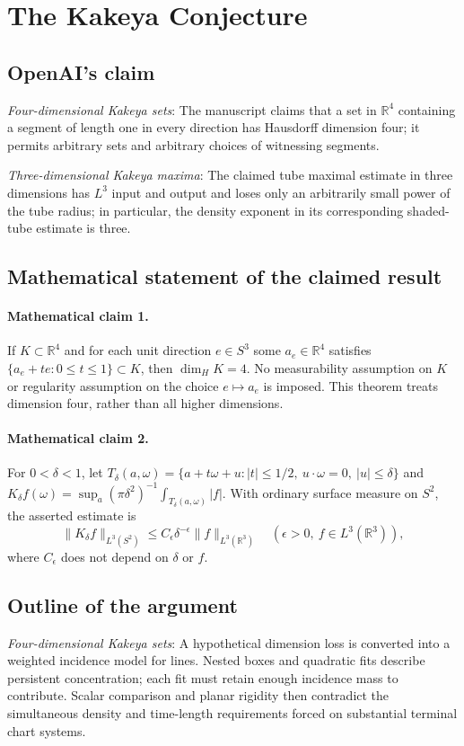 \documentclass[11pt]{article}
\begin{document}
\section*{The Kakeya Conjecture}

\subsection{OpenAI's claim}
\textit{Four-dimensional Kakeya sets}: The manuscript claims that a set in $\mathbb R^4$ containing a segment of length one in every direction has Hausdorff dimension four; it permits arbitrary sets and arbitrary choices of witnessing segments.

\textit{Three-dimensional Kakeya maxima}: The claimed tube maximal estimate in three dimensions has $L^3$ input and output and loses only an arbitrarily small power of the tube radius; in particular, the density exponent in its corresponding shaded-tube estimate is three.

\subsection{Mathematical statement of the claimed result}
\paragraph{Mathematical claim 1.} If $K\subset\mathbb R^4$ and for each unit direction $e\in S^3$ some $a_e\in\mathbb R^4$ satisfies $\{a_e+te:0\le t\le1\}\subset K$, then $\dim_H K=4$. No measurability assumption on $K$ or regularity assumption on the choice $e\mapsto a_e$ is imposed. This theorem treats dimension four, rather than all higher dimensions.

\paragraph{Mathematical claim 2.} For $0<\delta<1$, let $T_\delta(a,\omega)=\{a+t\omega+u:|t|\le1/2,\ u\cdot\omega=0,\ |u|\le\delta\}$ and $K_\delta f(\omega)=\sup_a(\pi\delta^2)^{-1}\int_{T_\delta(a,\omega)}|f|$. With ordinary surface measure on $S^2$, the asserted estimate is \[\|K_\delta f\|_{L^3(S^2)}\le C_\epsilon\delta^{-\epsilon}\|f\|_{L^3(\mathbb R^3)}\quad(\epsilon>0,\ f\in L^3(\mathbb R^3)),\] where $C_\epsilon$ does not depend on $\delta$ or $f$.

\subsection{Outline of the argument}
\textit{Four-dimensional Kakeya sets}: A hypothetical dimension loss is converted into a weighted incidence model for lines. Nested boxes and quadratic fits describe persistent concentration; each fit must retain enough incidence mass to contribute. Scalar comparison and planar rigidity then contradict the simultaneous density and time-length requirements forced on substantial terminal chart systems.
\end{document}
